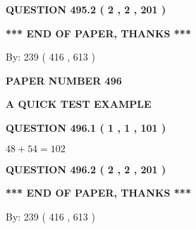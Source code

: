 \documentclass[12pt]{article}
\begin{document}
{\textbf{\Large{QUESTION
495.2 
 ( 2 , 2 , 201 )
}}}
  
  
   
   
 \vspace{0.2in}
 
   
   
   
   
\vspace{1.0in} 
{\textbf{\large{ *** END OF PAPER, THANKS *** }}} 
   
   
\hspace{1.0in} By: 
 239 ( 416 ,  613 )
   
   
   
   
\newpage 
\setcounter{page}{ 
   496001 } 
   
   
   
   
 {\textbf{ \Large{ PAPER NUMBER  496  }}}
   
   
\vspace{0.2in}
   
   
   
   
   
   
 \vspace{0.2in}
{\LARGE {\textbf{ A QUICK TEST EXAMPLE}}}
   
   
  
\vspace{0.2in}
  
{\textbf{\Large{QUESTION
496.1 
 ( 1 , 1 , 101 )
}}}
  
  
 
 

$ %
48 +  %
54=   %
102$
 
 
  
\vspace{0.2in}
  
{\textbf{\Large{QUESTION
496.2 
 ( 2 , 2 , 201 )
}}}
  
  
   
   
 \vspace{0.2in}
 
   
   
   
   
\vspace{1.0in} 
{\textbf{\large{ *** END OF PAPER, THANKS *** }}} 
   
   
\hspace{1.0in} By: 
 239 ( 416 ,  613 )
   
   
   
   
\newpage 
\setcounter{page}{ 
   497001 } 
   
\end{document}
